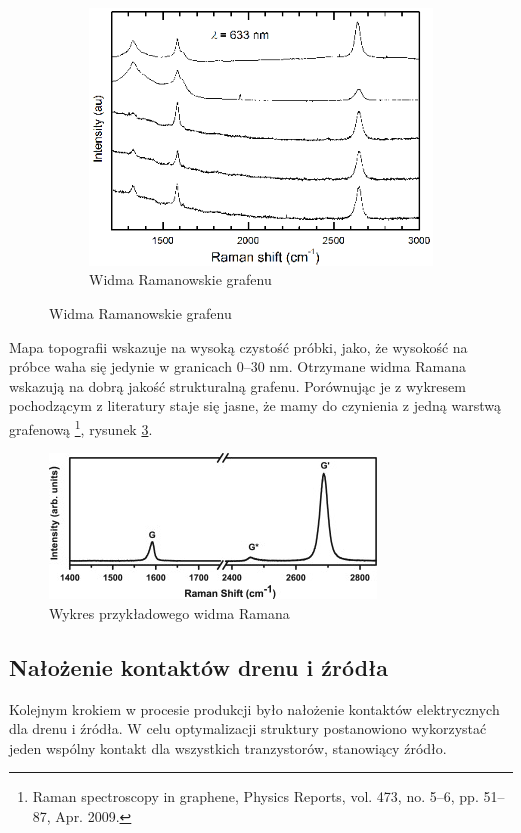 \begin{figure}[ht]
\begin{subfigure}[b]{0.48\textwidth}
                \includegraphics[width=\textwidth]{./Rozdzial_3/obrazki/RAMAN}
                \caption{Widma Ramanowskie grafenu}
                \label{fig:RamanCVD}
        \end{subfigure}
\end{figure}

Mapa topografii wskazuje na wysoką czystość próbki, jako, że wysokość na próbce waha się jedynie w granicach 0--30 nm.
Otrzymane widma Ramana wskazują na dobrą jakość strukturalną grafenu. Porównując je z wykresem pochodzącym z literatury
staje się jasne, że mamy do czynienia z jedną warstwą grafenową \footnote{Raman spectroscopy in graphene, 
Physics Reports, vol. 473, no. 5–6, pp. 51–87, Apr. 2009.}, rysunek \ref{fig:RamanCVDLiteratura}.

	\begin{figure}[ht]
	\centering
	\includegraphics[width=.60\textwidth]{./Rozdzial_3/obrazki/RAMANodniesienie}
	\caption{Wykres przykładowego widma Ramana }
	\label{fig:RamanCVDLiteratura}
	\end{figure}
\subsection{Nałożenie kontaktów drenu i źródła}
	Kolejnym krokiem w procesie produkcji było nałożenie kontaktów elektrycznych dla drenu i źródła. W celu
optymalizacji struktury postanowiono wykorzystać jeden wspólny kontakt dla wszystkich tranzystorów, stanowiący źródło. 

